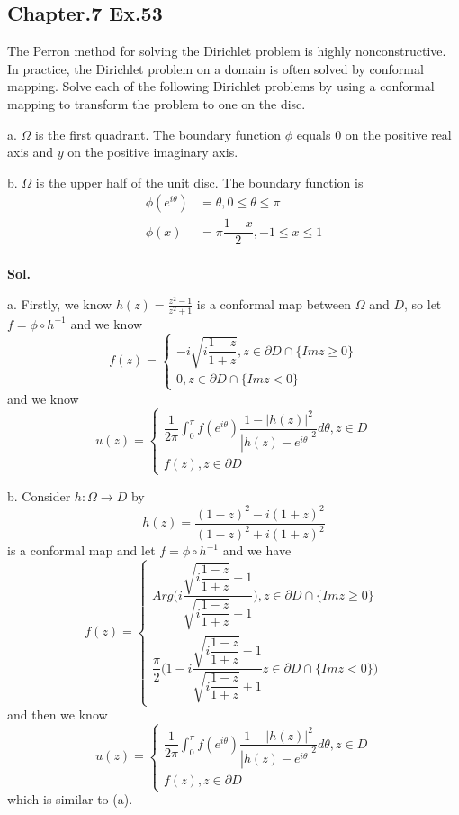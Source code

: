\documentclass[lang=en,11pt,a4paper,citestyle =authoryear]{elegantpaper}
\begin{document}
\subsection*{Chapter.7 Ex.53} 
The Perron method for solving the Dirichlet problem is highly nonconstructive. In practice, the Dirichlet problem on a domain is often solved by conformal mapping. Solve each of the following Dirichlet problems by using a conformal mapping to transform the problem to one on the disc.\par
a. $\Omega$ is the first quadrant. The boundary function $\phi$ equals $0$ on the positive real axis and $y$ on the positive imaginary axis.\par
b. $\Omega$ is the upper half of the unit disc. The boundary function is
\[
\begin{aligned}
    \phi(e^{i\theta}) &= \theta, 0 \leq \theta \leq \pi \\
    \phi(x) &= \pi\dfrac{1-x}{2}, -1 \leq x \leq 1
\end{aligned}
\]
\vspace{0.5em}\\
\textbf{Sol.} \par
a. Firstly, we know $h(z) = \tfrac{z^2-1}{z^2+1}$ is a conformal map between $\Omega$ and $D$, so let $f = \phi\circ h^{-1}$ and we know
\[
f(z) = \begin{cases}
    -i\sqrt{i\dfrac{1-z}{1+z}}, z\in \partial D \cap \{Imz\geq 0\} \\
    0, z\in \partial D\cap \{Im z < 0\}
\end{cases}
\]
and we know
\[u(z) = \begin{cases}
    \dfrac{1}{2\pi}\int_0^{\pi}f(e^{i\theta})\dfrac{1-|h(z)|^2}{|h(z)-e^{i\theta}|^2} d\theta, z\in D\\
    f(z), z\in \partial D
\end{cases}\]\par
b. Consider $h:\overline{\Omega} \to \overline{D}$ by
\[h(z) = \dfrac{(1-z)^2-i(1+z)^2}{(1-z)^2+i(1+z)^2}\]
is a conformal map and let $f = \phi\circ h^{-1}$ and we have
\[
f(z) = \begin{cases}
    Arg\Big(i\dfrac{\sqrt{i\dfrac{1-z}{1+z}}-1}{\sqrt{i\dfrac{1-z}{1+z}}+1}\Big), z\in\partial D \cap \{Im z \geq 0\}\\
    \dfrac{\pi}{2}\Big(1-i\dfrac{\sqrt{i\dfrac{1-z}{1+z}}-1}{\sqrt{i\dfrac{1-z}{1+z}}+1}z \in \partial D\cap \{Im z<0\}\Big)
\end{cases}
\]
and then we know
\[
u(z) = \begin{cases}
    \dfrac{1}{2\pi}\int_0^{\pi}f(e^{i\theta})\dfrac{1-|h(z)|^2}{|h(z)-e^{i\theta}|^2} d\theta, z\in D\\
    f(z), z\in \partial D
\end{cases}
\]
which is similar to (a).
\vspace{0.5em}
\end{document}
